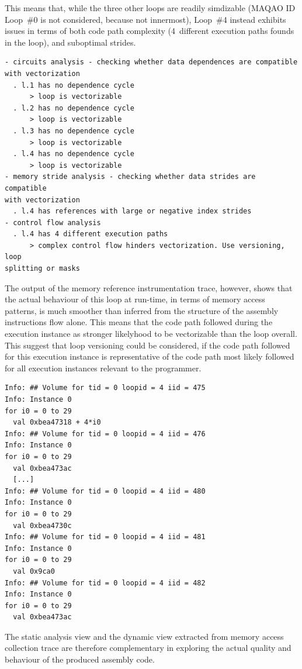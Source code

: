 \documentclass[11pt, a4paper, twoside]{montblanc2}
\begin{document}
This means that, while the three other loops are readily 
simdizable (MAQAO ID Loop~\#0 is not considered, because not innermost), Loop~\#4 instead exhibits issues in terms of both code path complexity 
(4~different execution paths founds in the loop), and suboptimal strides.

\begin{verbatim}
- circuits analysis - checking whether data dependences are compatible
with vectorization
  . l.1 has no dependence cycle
      > loop is vectorizable
  . l.2 has no dependence cycle
      > loop is vectorizable
  . l.3 has no dependence cycle
      > loop is vectorizable
  . l.4 has no dependence cycle
      > loop is vectorizable
- memory stride analysis - checking whether data strides are compatible
with vectorization
  . l.4 has references with large or negative index strides
- control flow analysis
  . l.4 has 4 different execution paths
      > complex control flow hinders vectorization. Use versioning, loop
splitting or masks
\end{verbatim}

The output of the memory reference instrumentation trace, however, shows that 
the actual behaviour of this loop at run-time, in terms of memory access patterns, is 
much smoother than inferred from the structure of the assembly instructions flow alone.
This means that the code path followed during the execution instance as stronger likelyhood to be
vectorizable than the loop overall. This suggest that loop versioning could be considered, if the
code path followed for this execution instance is representative of the code path most likely 
followed for all execution instances relevant to the programmer.

\begin{small}
\begin{verbatim}
Info: ## Volume for tid = 0 loopid = 4 iid = 475
Info: Instance 0
for i0 = 0 to 29
  val 0xbea47318 + 4*i0
Info: ## Volume for tid = 0 loopid = 4 iid = 476
Info: Instance 0
for i0 = 0 to 29
  val 0xbea473ac
  [...]
Info: ## Volume for tid = 0 loopid = 4 iid = 480
Info: Instance 0
for i0 = 0 to 29
  val 0xbea4730c
Info: ## Volume for tid = 0 loopid = 4 iid = 481
Info: Instance 0
for i0 = 0 to 29
  val 0x9ca0
Info: ## Volume for tid = 0 loopid = 4 iid = 482
Info: Instance 0
for i0 = 0 to 29
  val 0xbea473ac
\end{verbatim}
\end{small}

The static analysis view and the dynamic view extracted from memory access 
collection trace are therefore complementary in exploring the actual quality and 
behaviour of the produced assembly code.
\end{document}
